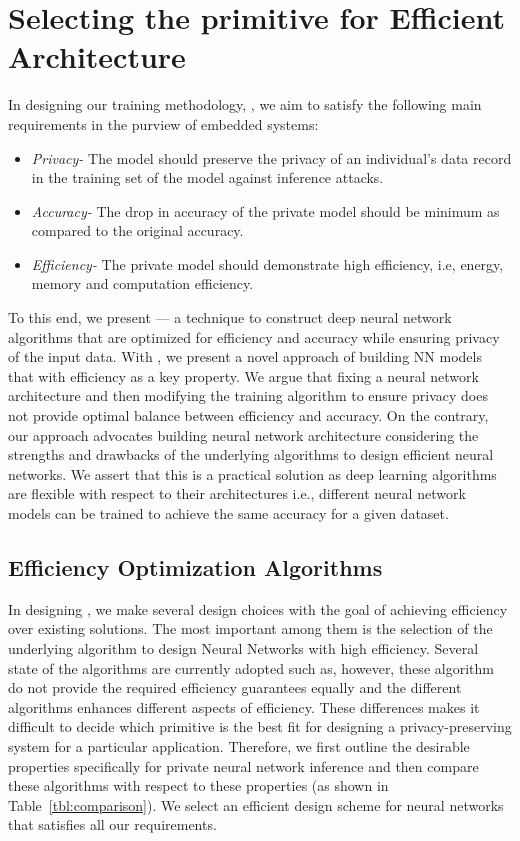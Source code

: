 \section{Selecting the primitive for Efficient Architecture}

In designing our training methodology, \method, we aim to satisfy the following main requirements in the purview of embedded systems:

\begin{itemize}
\item {\em Privacy-}
The model should preserve the privacy of an individual's data record in the training set of the model against inference attacks.

\item {\em Accuracy-}
The drop in accuracy of the private model should be minimum as compared to the original accuracy.

\item {\em Efficiency-}
The private model should demonstrate high efficiency, i.e, energy, memory and computation efficiency.
\end{itemize}

To this end, we present \method --- a technique to construct deep neural network algorithms that are optimized for efficiency and accuracy while ensuring privacy of the input data.
With \method, we present a novel approach of building NN models that with efficiency as a key property.
We argue that fixing a neural network architecture and then modifying the training algorithm to ensure privacy does not provide optimal balance between efficiency and accuracy.
On the contrary, our approach advocates building neural network architecture considering the strengths and drawbacks of the underlying algorithms to design efficient neural networks.
We assert that this is a practical solution as deep learning algorithms are flexible with respect to their architectures i.e., different neural network models can be trained to achieve the same accuracy for a given dataset.



\subsection{Efficiency Optimization Algorithms}

In designing \method, we make several design choices with the goal of achieving efficiency over existing solutions.
The most important among them is the selection of the underlying algorithm to design Neural Networks with high efficiency.
Several state of the algorithms are currently adopted such as, however, these algorithm do not provide the required efficiency guarantees equally and the different algorithms enhances different aspects of efficiency.
These differences makes it difficult to decide which primitive is the best fit for designing a privacy-preserving system for a particular application.
Therefore, we first outline the desirable properties specifically for private neural network inference and then compare these algorithms with respect to these properties (as shown in Table~\ref{tbl:comparison}).
We select an efficient design scheme for neural networks that satisfies all our requirements.

